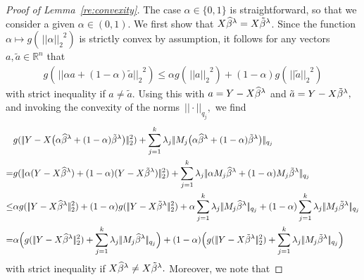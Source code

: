 \documentclass[bj]{imsart}
\newcommand{\normtwo}[1]{\ensuremath{\!|\!| #1 | \! |_{2}}}
\newcommand{\normqj}[1]{\ensuremath{\!|\!| #1 | \! |_{q_j}}}
\newcommand{\1}{{\rm 1}\mskip -4,5mu{\rm l} }
\def\R{\mathbb{R}}
\begin{document}
\begin{proof}[Proof of Lemma~\ref{re:convexity}] 
The case $\alpha\in\{0,1\}$ is straightforward, so that we consider a given $\alpha\in(0,1).$ We first show that $\textcolor{black}{X}\widehat \beta^{\lambda}=\textcolor{black}{X} \tilde\beta^{\lambda}$. %
Since the function $\alpha\mapsto g(\,\normtwo{\alpha}^2)$ is strictly convex by assumption, it follows for any vectors $a,\tilde a\in\R^n$ that
\begin{align*}
g(\,\normtwo{\alpha a+(1-\alpha)\tilde a}^{2})\le \alpha g(\,\normtwo{a}^{2})+(1-\alpha)g(\,\normtwo{\tilde a}^{2})
\end{align*}
with strict inequality if $a\neq \tilde a$.  Using this with $a=\textcolor{black}{Y}-\textcolor{black}{X} \widehat \beta^{\lambda}$ and $\tilde a= \textcolor{black}{Y}-\textcolor{black}{X}\tilde\beta^{\lambda},$ and invoking the convexity of the norms~$\normqj{\cdot},$ we find
\begin{align*}
&g(\,\normtwo{\outcome-\design\big(\alpha \estimatort+(1-\alpha)\tildeestimator\big)}^{2})+\sum_{j=1}^{\numbergroups}\lambda_j\,\normqj{\fusedmatrix_j\big(\alpha \estimatort+(1-\alpha)\tildeestimator\big)}\\
=&g(\,\normtwo{\alpha(\outcome-\design\estimatort)+(1-\alpha)(\outcome-\design\tildeestimator)}^{2})+\sum_{j=1}^{\numbergroups}\lambda_j\,\normqj{\alpha \fusedmatrix_j\estimatort+(1-\alpha)\fusedmatrix_j\tildeestimator}\\
\leq&\alpha g(\,\normtwo{\outcome-\design\estimatort}^{2})+(1-\alpha)g(\,\normtwo{\outcome-\design\tildeestimator}^{2})+\alpha\sum_{j=1}^{\numbergroups} \lambda_j \,\normqj{\fusedmatrix_j\estimatort}+(1-\alpha)\sum_{j=1}^{\numbergroups}\lambda_j \, \normqj{\fusedmatrix_j\tildeestimator}\\
=&\alpha \Big(g(\,\normtwo{\outcome-\design\estimatort}^{2})+\sum_{j=1}^{\numbergroups} \lambda_j \,\normqj{\fusedmatrix_j\estimatort}\Big)+(1-\alpha)\Big(g(\,\normtwo{\outcome-\design\tildeestimator}^{2})+\sum_{j=1}^{\numbergroups}\lambda_j\,\normqj{\fusedmatrix_j\tildeestimator}\Big)
\end{align*}
with strict inequality if $\textcolor{black}{X}\widehat \beta^{\lambda}\neq \textcolor{black}{X} \tilde\beta^{\lambda}.$ 
Moreover, we note that 

\end{proof}
\end{document}

